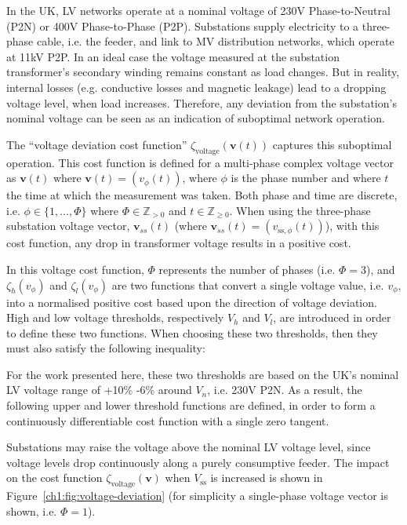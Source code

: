 In the UK, LV networks operate at a nominal voltage of 230V Phase-to-Neutral (P2N) or 400V Phase-to-Phase (P2P).
Substations supply electricity to a three-phase cable, i.e. the feeder, and  link to MV distribution networks, which operate at 11kV P2P.
In an ideal case the voltage measured at the substation transformer's secondary winding remains constant as load changes.
But in reality, internal losses (e.g. conductive losses and magnetic leakage) lead to a dropping voltage level, when load increases.
Therefore, any deviation from the substation's nominal voltage can be seen as an indication of suboptimal network operation.

The ``voltage deviation cost function'' $\zeta_\text{voltage}(\textbf{v}(t))$ captures this suboptimal operation.
This cost function is defined for a multi-phase complex voltage vector as $\textbf{v}(t)$ where $\textbf{v}(t) = (v_\phi(t))$, where $\phi$ is the phase number and where $t$ the time at which the measurement was taken.
Both phase and time are discrete, i.e. $\phi \in \{1,\dots,\Phi\}$ where $\Phi \in \mathbb{Z}_{>0}$ and $t \in \mathbb{Z}_{\geq0}$.
When using the three-phase substation voltage vector, $\textbf{v}_{ss}(t)$ (where $\textbf{v}_{ss}(t) = (v_{\text{ss},\phi}(t))$), with this cost function, any drop in transformer voltage results in a positive cost.



In this voltage cost function, $\Phi$ represents the number of phases (i.e. $\Phi = 3$), and $\zeta_h(v_\phi)$ and $\zeta_l(v_\phi)$ are two functions that convert a single voltage value, i.e. $v_\phi$, into a normalised positive cost based upon the direction of voltage deviation.
High and low voltage thresholds, respectively $V_h$ and $V_l$, are introduced in order to define these two functions.
When choosing these two thresholds, then they must also satisfy the following inequality:



For the work presented here, these two thresholds are based on the UK's nominal LV voltage range of +10\% -6\% around $V_n$, i.e. 230V P2N.
As a result, the following upper and lower threshold functions are defined, in order to form a continuously differentiable cost function with a single zero tangent.



Substations may raise the voltage above the nominal LV voltage level, since voltage levels drop continuously along a purely consumptive feeder.
The impact on the cost function $\zeta_\text{voltage}(\textbf{v})$ when $V_\text{ss}$ is increased is shown in Figure~\ref{ch1:fig:voltage-deviation} (for simplicity a single-phase voltage vector is shown, i.e. $\Phi = 1$).

